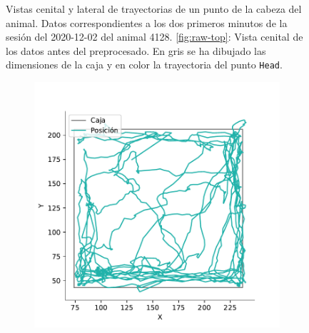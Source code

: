 \begin{figure}[]
\begin{subfigure}{0.45\textwidth}
    \caption{}
  \end{subfigure}
  \caption[Trayectorias durante el preprocesado.]{Vistas cenital y lateral de trayectorias de un punto de la cabeza del animal. Datos correspondientes a los dos primeros minutos de la sesión del 2020-12-02 del animal 4128. \ref{fig:raw-top}: Vista cenital de los datos antes del preprocesado. En gris se ha dibujado las dimensiones de la caja y en color la trayectoria del punto \texttt{Head}.}
  \label{fig:raw-trayectories}
\end{figure}

\begin{figure}[]
  \centering
  \begin{subfigure}{0.45\textwidth}
    \centering
    \includegraphics[width=\textwidth]{figures/interpolated-trayectory-top-4128-2020-12-02.pdf}
    \caption{}
    \label{fig:inter-top}
  \end{subfigure}
  \begin{subfigure}{0.45\textwidth}
    \centering

\end{subfigure}
\end{figure}
